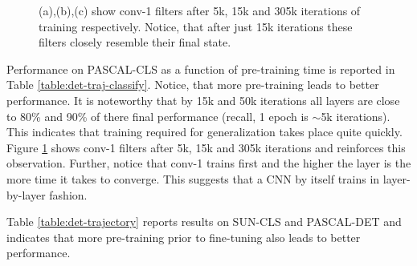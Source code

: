 \begin{figure}[t!]
\caption{(a),(b),(c) show conv-1 filters after 5k, 15k and 305k iterations of training respectively. Notice, that after just 15k iterations these filters closely resemble their final state.}

\label{fig:conv1}
\end{figure}

Performance on PASCAL-CLS as a function of pre-training time is reported in Table \ref{table:det-traj-classify}. Notice, that more pre-training leads to better performance. It is noteworthy that by 15k and 50k iterations all layers are close to 80\% and  90\% of there final performance (recall, 1 epoch is $\sim$5k iterations). This indicates that training required for generalization takes place quite quickly. Figure \ref{fig:conv1} shows conv-1 filters after 5k, 15k and 305k iterations and reinforces this observation. Further, notice that conv-1 trains first and the higher the layer is the more time it takes to converge. This suggests that a CNN by itself trains in layer-by-layer fashion.   

Table \ref{table:det-trajectory} reports results on SUN-CLS and PASCAL-DET and indicates that more pre-training prior to fine-tuning also leads to better performance.  




